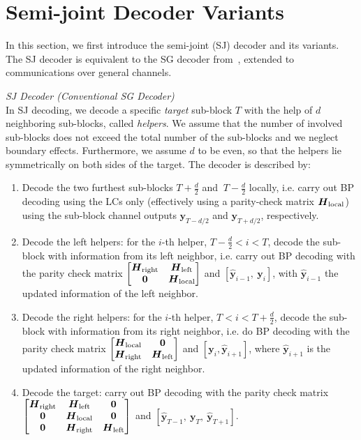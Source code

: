\section{Semi-joint Decoder Variants}
In this section, we first introduce the semi-joint (SJ) decoder and its variants. The SJ decoder is equivalent to the SG decoder from~\cite{9594186,9174265}, extended to communications over general channels. %

\vspace*{0.8ex}
\noindent\emph{SJ Decoder (Conventional SG Decoder)~\cite{8625294}} \\
In SJ decoding, we decode a specific \emph{target} sub-block $T$ with the help of $d$ neighboring sub-blocks, called \emph{helpers}. We assume that the number of involved sub-blocks does not exceed the total number of the sub-blocks and we neglect boundary effects. Furthermore, we assume $d$ to be even, so that the helpers lie symmetrically on both sides of the target. The decoder is described by:\vspace{0.2ex}

\begin{enumerate}
    \item Decode the two furthest sub-blocks $T+\frac d2$ and $\ T-\frac d2$ locally, i.e. carry out BP decoding using the LCs only (effectively using a parity-check matrix $\boldsymbol{H}_\text{local}$) using the sub-block channel outputs $\boldsymbol{y}_{T- d/2}$ and $\boldsymbol{y}_{T+d/2}$, respectively.
    \item Decode the left helpers: for the $i$-th helper, $T- \frac d2 < i < T$, decode the sub-block with information from its left neighbor, i.e. carry out BP decoding with the parity check matrix $\left[\begin{matrix}\boldsymbol{H}_\text{right} & \boldsymbol{H}_\text{left} \\ \boldsymbol{0} & \boldsymbol{H}_\text{local}\end{matrix}\right]$ and $[\hat{\boldsymbol{y}}_{i-1},\ \boldsymbol{y}_i]$, with $\hat{\boldsymbol{y}}_{i-1}$ the updated information of the left neighbor.
    \item Decode the right helpers: for the $i$-th helper, $T<i<T+\frac d2$, decode the sub-block with information from its right neighbor, i.e. do BP decoding with the parity check matrix $\left[\begin{matrix}\boldsymbol{H}_\text{local} & \boldsymbol{0} \\ \boldsymbol{H}_\text{right} & \boldsymbol{H}_\text{left} \end{matrix}\right]$ and $[\boldsymbol{y}_i, \hat{\boldsymbol{y}}_{i+1}]$, where $\hat{\boldsymbol{y}}_{i+1}$ is the updated information of the right neighbor.
    \item Decode the target: carry out BP decoding with the parity check matrix $\left[\begin{matrix}\boldsymbol{H}_\text{right} & \boldsymbol{H}_\text{left} & \boldsymbol{0} \\ \boldsymbol{0} & \boldsymbol{H}_\text{local} & \boldsymbol{0} \\\boldsymbol{0} & \boldsymbol{H}_\text{right} & \boldsymbol{H}_\text{left} \end{matrix}\right]$ and $[\hat{\boldsymbol{y}}_{T-1},\ \boldsymbol{y}_T,\ \hat{\boldsymbol{y}}_{T+1}]$.
\end{enumerate}

